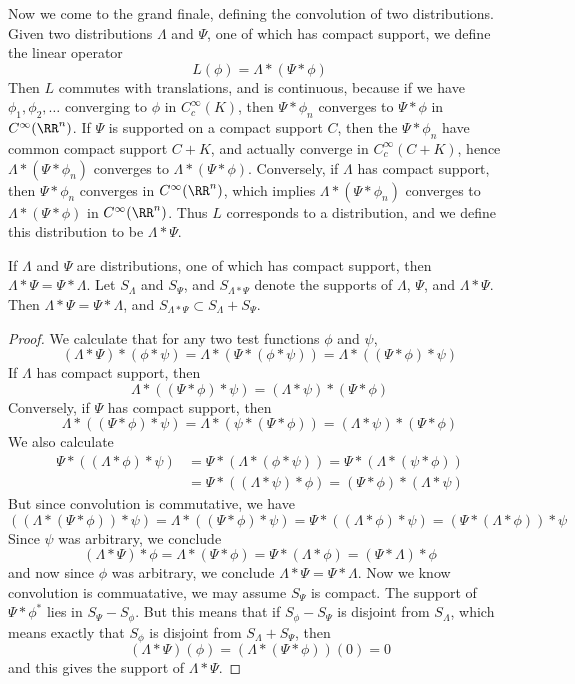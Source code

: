 Now we come to the grand finale, defining the convolution of two distributions. Given two distributions $\Lambda$ and $\Psi$, one of which has compact support, we define the linear operator
%
\[ L(\phi) = \Lambda * (\Psi * \phi) \]
%
Then $L$ commutes with translations, and is continuous, because if we have $\phi_1, \phi_2, \dots$ converging to $\phi$ in $C_c^\infty(K)$, then $\Psi * \phi_n$ converges to $\Psi * \phi$ in $C^\infty(\RR^n)$. If $\Psi$ is supported on a compact support $C$, then the $\Psi * \phi_n$ have common compact support $C + K$, and actually converge in $C_c^\infty(C + K)$, hence $\Lambda * (\Psi * \phi_n)$ converges to $\Lambda * (\Psi * \phi)$. Conversely, if $\Lambda$ has compact support, then $\Psi * \phi_n$ converges in $C^\infty(\RR^n)$, which implies $\Lambda * (\Psi * \phi_n)$ converges to $\Lambda * (\Psi * \phi)$ in $C^\infty(\RR^n)$. Thus $L$ corresponds to a distribution, and we define this distribution to be $\Lambda * \Psi$.

\begin{theorem}
    If $\Lambda$ and $\Psi$ are distributions, one of which has compact support, then $\Lambda * \Psi = \Psi * \Lambda$. Let $S_\Lambda$ and $S_\Psi$, and $S_{\Lambda * \Psi}$ denote the supports of $\Lambda$, $\Psi$, and $\Lambda * \Psi$. Then $\Lambda * \Psi = \Psi * \Lambda$, and $S_{\Lambda * \Psi} \subset S_\Lambda + S_\Psi$.
\end{theorem}
\begin{proof}
    We calculate that for any two test functions $\phi$ and $\psi$,
    \[ (\Lambda * \Psi) * (\phi * \psi) = \Lambda * (\Psi * (\phi * \psi)) = \Lambda * ((\Psi * \phi) * \psi) \]
    If $\Lambda$ has compact support, then
    \[ \Lambda * ((\Psi * \phi) * \psi) = (\Lambda * \psi) * (\Psi * \phi) \]
    Conversely, if $\Psi$ has compact support, then
    \[ \Lambda * ((\Psi * \phi) * \psi) = \Lambda * (\psi * (\Psi * \phi)) = (\Lambda * \psi) * (\Psi * \phi) \]
    We also calculate
    \begin{align*}
        \Psi * ((\Lambda * \phi) * \psi) &= \Psi * (\Lambda * (\phi * \psi)) = \Psi * (\Lambda * (\psi * \phi))\\
        &= \Psi * ((\Lambda * \psi) * \phi) = (\Psi * \phi) * (\Lambda * \psi)
    \end{align*}
    But since convolution is commutative, we have
    \[ ((\Lambda * (\Psi * \phi)) * \psi) = \Lambda * ((\Psi * \phi) * \psi) = \Psi * ((\Lambda * \phi) * \psi) = (\Psi * (\Lambda * \phi)) * \psi \]
    Since $\psi$ was arbitrary, we conclude
    \[ (\Lambda * \Psi) * \phi = \Lambda * (\Psi * \phi) = \Psi * (\Lambda * \phi) = (\Psi * \Lambda) * \phi \]
    and now since $\phi$ was arbitrary, we conclude $\Lambda * \Psi = \Psi * \Lambda$. Now we know convolution is commuatative, we may assume $S_\Psi$ is compact. The support of $\Psi * \phi^*$ lies in $S_\Psi - S_\phi$. But this means that if $S_\phi - S_\Psi$ is disjoint from $S_\Lambda$, which means exactly that $S_\phi$ is disjoint from $S_\Lambda + S_\Psi$, then
    \[ (\Lambda * \Psi)(\phi) = (\Lambda * (\Psi * \phi))(0) = 0 \]
    and this gives the support of $\Lambda * \Psi$.
\end{proof}


